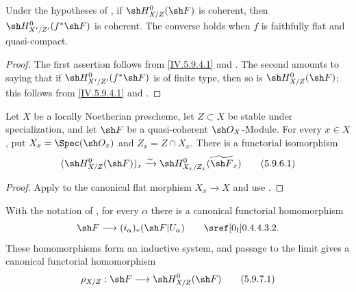 \begin{corollary}[5.9.5]
\label{IV.5.9.5}
Under the hypotheses of , if
$\sh H^0_{X/Z}(\sh F)$ is coherent, then
$\sh H^0_{X'/Z'}(f^*\sh F)$ is coherent.  The converse holds when
$f$ is faithfully flat and quasi-compact.
\end{corollary}

\begin{proof}
The first assertion follows from \eqref{IV.5.9.4.1} and
.  The second amounts to saying that if
$\sh H^0_{X'/Z'}(f^*\sh F)$ is of finite type, then so is
$\sh H^0_{X/Z}(\sh F)$; this follows from \eqref{IV.5.9.4.1} and
.
\end{proof}

\begin{corollary}[5.9.6]
\label{IV.5.9.6}
Let $X$ be a locally Noetherian prescheme, let $Z\subset X$ be stable
under specialization, and let $\sh F$ be a quasi-coherent
$\sh O_X$-Module.  For every $x\in X$, put
$X_x=\Spec(\sh O_x)$ and $Z_x=Z\cap X_x$.  There is a functorial
isomorphism
\begin{equation}
\label{IV.5.9.6.1}
 (\sh H^0_{X/Z}(\sh F))_x
 \xrightarrow{\sim}
 \sh H^0_{X_x/Z_x}(\widetilde{\sh F}_x)
\tag{5.9.6.1}
\end{equation}
\end{corollary}

\begin{proof}
Apply  to the canonical flat morphism $X_x\to X$ and
use .
\end{proof}

\begin{env}[5.9.7]
\label{IV.5.9.7}
With the notation of , for every $\alpha$ there is a
canonical functorial homomorphism
\[
 \sh F\longrightarrow(i_\alpha)_*(\sh F|U_\alpha)
 \qquad\text{\sref[0\textsubscript{\mdseries I}]{0.4.4.3.2}}.
\]
These homomorphisms form an inductive system, and passage to the
limit gives a canonical functorial homomorphism
\begin{equation}
\label{IV.5.9.7.1}
 \rho_{X/Z}:\sh F\longrightarrow\sh H^0_{X/Z}(\sh F)
\tag{5.9.7.1}
\end{equation}
\end{env}


